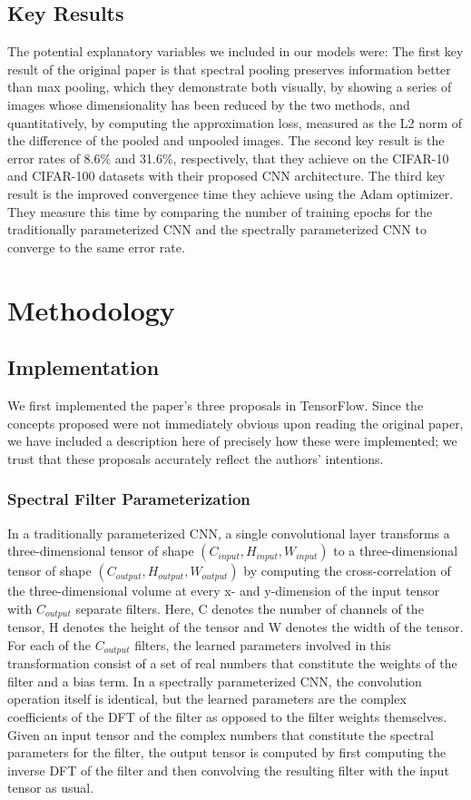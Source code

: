 \documentclass[10pt,journal,compsoc]{IEEEtran}
\begin{document}
\subsection{Key Results}
The potential explanatory variables we included in our models were:
The first key result of the original paper is that spectral pooling preserves information better than max pooling, which they demonstrate both visually, by showing a series of images whose dimensionality has been reduced by the two methods, and quantitatively, by computing the approximation loss, measured as the L2 norm of the difference of the pooled and unpooled images. The second key result is the error rates of 8.6\% and 31.6\%, respectively, that they achieve on the CIFAR-10 and CIFAR-100 datasets with their proposed CNN architecture. The third key result is the improved convergence time they achieve using the Adam optimizer. They measure this time by comparing the number of training epochs for the traditionally parameterized CNN and the spectrally parameterized CNN to converge to the same error rate.

\section{Methodology}

\subsection{Implementation}
We first implemented the paper's three proposals in TensorFlow. Since the concepts proposed were not immediately obvious upon reading the original paper, we have included a description here of precisely how these were implemented; we trust that these proposals accurately reflect the authors' intentions. 

\subsubsection{Spectral Filter Parameterization}
In a traditionally parameterized CNN, a single convolutional layer transforms a three-dimensional tensor of shape $(C_{input}, H_{input}, W_{input})$ to a three-dimensional tensor of shape 
$(C_{output}, H_{output}, W_{output})$ by computing the cross-correlation of the three-dimensional volume at every x- and y-dimension of the input tensor with $C_{output}$ separate filters. Here, C denotes the number of channels of the tensor, H denotes the height of the tensor and W denotes the width of the tensor. For each of the $C_{output}$ filters, the learned parameters involved in this transformation consist of a set of real numbers that constitute the weights of the filter and a bias term. In a spectrally parameterized CNN, the convolution operation itself is identical, but the learned parameters are the complex coefficients of the DFT of the filter as opposed to the filter weights themselves. Given an input tensor and the complex numbers that constitute the spectral parameters for the filter, the output tensor is computed by first computing the inverse DFT of the filter and then convolving the resulting filter with the input tensor as usual. 
\end{document}

